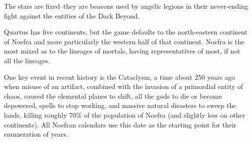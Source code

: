 The stars are  fixed--they are beacons used by angelic legions in their never-ending fight against the entities of the Dark Beyond.

Quartus has five continents, but the game defaults to the north-eastern continent of Noefra and more particularly the western half of that continent. Noefra is the most mixed as to the lineages of mortals, having representatives of most, if not all the lineages.

One key event in recent history is the Cataclysm, a time about 250 years ago when misuse of an artifact, combined with the invasion of a primordial entity of chaos, caused the elemental planes to shift, all the gods to die or become depowered, spells to stop working, and massive natural disasters to sweep the lands, killing roughly 70\% of the population of Noefra (and slightly less on other continents). All Noefran calendars use this date as the starting point for their enumeration of years.

